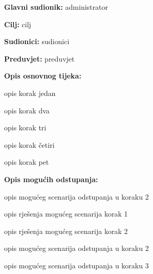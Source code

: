 					\noindent {}
					\begin{packed_item}
						
						\item \textbf{Glavni sudionik: }administrator
						\item  \textbf{Cilj:} cilj
						\item  \textbf{Sudionici:} sudionici
						\item  \textbf{Preduvjet:} preduvjet
						\item  \textbf{Opis osnovnog tijeka:}
						
						\item[] \begin{packed_enum}
							
							\item opis korak jedan
							\item opis korak dva
							\item opis korak tri
							\item opis korak četiri
							\item opis korak pet
						\end{packed_enum}
						
						\item  \textbf{Opis mogućih odstupanja:}
						
						\item[] \begin{packed_item}
							
							\item[2.a] opis mogućeg scenarija odstupanja u koraku 2
							\item[] \begin{packed_enum}
								
								\item opis rješenja mogućeg scenarija korak 1
								\item opis rješenja mogućeg scenarija korak 2
								
							\end{packed_enum}
							\item[2.b] opis mogućeg scenarija odstupanja u koraku 2
							\item[3.a] opis mogućeg scenarija odstupanja  u koraku 3
							
						\end{packed_item}
					\end{packed_item}
					
